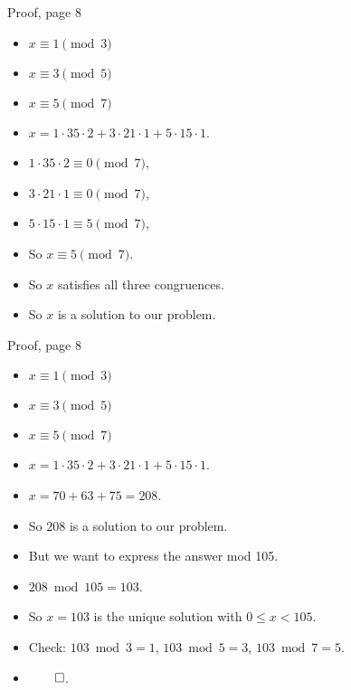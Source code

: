 \documentclass{beamer}
\begin{document}
\begin{frame}{Proof, page 8}

\begin{itemize}
  \item $x \equiv 1 \pmod 3$
  \item $x \equiv 3 \pmod 5$
  \item $x \equiv 5 \pmod 7$
  \item $x = 1 \cdot 35 \cdot 2 + 3 \cdot 21 \cdot 1 + 5 \cdot 15 \cdot 1$.
  \item $1 \cdot 35 \cdot 2 \equiv 0 \pmod 7$,
  \item $3 \cdot 21 \cdot 1 \equiv 0 \pmod 7$,
  \item $5 \cdot 15 \cdot 1 \equiv 5 \pmod 7$,
  \item So $x \equiv 5 \pmod 7$.
  \item So $x$ satisfies all three congruences.
  \item So $x$ is a solution to our problem.
\end{itemize}

\end{frame}

\begin{frame}{Proof, page 8}

\begin{itemize}
  \item $x \equiv 1 \pmod 3$
  \item $x \equiv 3 \pmod 5$
  \item $x \equiv 5 \pmod 7$
  \item $x = 1 \cdot 35 \cdot 2 + 3 \cdot 21 \cdot 1 + 5 \cdot 15 \cdot 1$.
  \item $x = 70 + 63 + 75 = 208$.
  \item So $208$ is a solution to our problem.
  \item But we want to express the answer mod 105.
  \item $208 \bmod 105 = 103$.
  \item So $x=103$ is the unique solution with $0\leq x < 105$.
  \item Check: $103 \bmod 3 = 1$, $103 \bmod  5 = 3$, $103\bmod 7 = 5$.
  \item $\qed$.
\end{itemize}

\end{frame}
\end{document}
